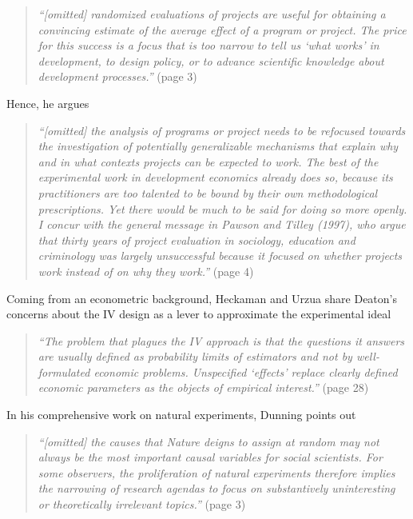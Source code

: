 \documentclass[11pt]{article}
\begin{document}
\begin{refsection}
\begin{quote}
\textit{
  ``[omitted] randomized evaluations of projects are useful for obtaining a
  convincing estimate of the average effect of a program or project. The price
  for this success is a focus that is too narrow to tell us `what works' in
  development, to design policy, or to advance scientific knowledge about
  development processes.''
  }
  (page 3)
\end{quote}

Hence, he argues

\begin{quote}
   \textit{
  ``[omitted] the analysis of programs or project needs to be refocused towards
  the investigation of potentially generalizable mechanisms that explain why and
  in what contexts projects can be expected to work. The best of the
  experimental work in development economics already does so, because its
  practitioners are too talented to be bound by their own methodological
  prescriptions. Yet there would be much to be said for doing so more openly. I
  concur with the general message in Pawson and Tilley (1997), who argue that
  thirty years of project evaluation in sociology, education and criminology was
  largely unsuccessful because it focused on whether projects work instead of on
  why they work.''
  }
  (page 4)
\end{quote}

Coming from an econometric background, Heckaman and Urzua \autocite*{heckman_urzua_2010} share Deaton's concerns about the IV design as a lever to approximate the experimental ideal

\begin{quote}
  \textit{
  ``The problem that plagues the IV approach is that the questions it answers
  are usually defined as probability limits of estimators and not by
  well-formulated economic problems. Unspecified `effects' replace clearly
  defined economic parameters as the objects of empirical interest.''
  }
  (page 28)
\end{quote}

In his comprehensive work on natural experiments, Dunning  \autocite*{dunning_2012} points out

\begin{quote}
  \textit{
  ``[omitted] the causes that Nature deigns to assign at random may not always
  be the most important causal variables for social scientists. For some
  observers, the proliferation of natural experiments therefore implies the
  narrowing of research agendas to focus on substantively uninteresting or
  theoretically irrelevant topics.''
  }
  (page 3)
\end{quote}


\end{refsection}
\end{document}
